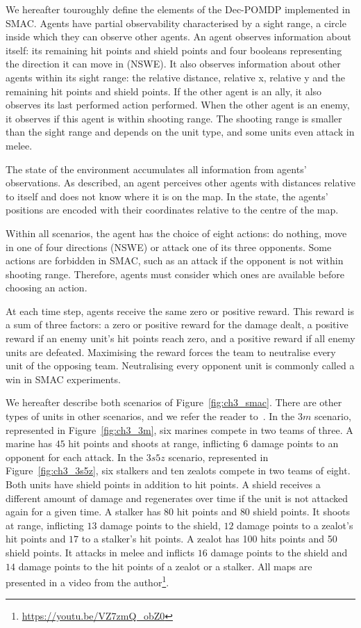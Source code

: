 We hereafter touroughly define the elements of the Dec-POMDP implemented in SMAC.
Agents have partial observability characterised by a sight range, a circle inside which they can observe other agents.
An agent observes information about itself: its remaining hit points and shield points and four booleans representing the direction it can move in (NSWE). 
It also observes information about other agents within its sight range: the relative distance, relative x, relative y and the remaining hit points and shield points. 
If the other agent is an ally, it also observes its last performed action performed.
When the other agent is an enemy, it observes if this agent is within shooting range.
The shooting range is smaller than the sight range and depends on the unit type, and some units even attack in melee.

The state of the environment accumulates all information from agents' observations.
As described, an agent perceives other agents with distances relative to itself and does not know where it is on the map.
In the state, the agents' positions are encoded with their coordinates relative to the centre of the map.

Within all scenarios, the agent has the choice of eight actions: do nothing, move in one of four directions (NSWE) or attack one of its three opponents.
Some actions are forbidden in SMAC, such as an attack if the opponent is not within shooting range.
Therefore, agents must consider which ones are available before choosing an action.

At each time step, agents receive the same zero or positive reward. 
This reward is a sum of three factors: a zero or positive reward for the damage dealt, a positive reward if an enemy unit's hit points reach zero, and a positive reward if all enemy units are defeated. 
Maximising the reward forces the team to neutralise every unit of the opposing team.
Neutralising every opponent unit is commonly called a win in SMAC experiments.

We hereafter describe both scenarios of Figure~\ref{fig:ch3_smac}.
There are other types of units in other scenarios, and we refer the reader to~\citep{samvelyan2019starcraft}.
In the $3m$ scenario, represented in Figure~\ref{fig:ch3_3m}, six marines compete in two teams of three.
A marine has $45$ hit points and shoots at range, inflicting $6$ damage points to an opponent for each attack.
In the $3s5z$ scenario, represented in Figure~\ref{fig:ch3_3s5z}, six stalkers and ten zealots compete in two teams of eight.
Both units have shield points in addition to hit points.
A shield receives a different amount of damage and regenerates over time if the unit is not attacked again for a given time.
A stalker has $80$ hit points and $80$ shield points.
It shoots at range, inflicting $13$ damage points to the shield, $12$ damage points to a zealot's hit points and $17$ to a stalker's hit points.
A zealot has 100 hits points and 50 shield points.
It attacks in melee and inflicts $16$ damage points to the shield and $14$ damage points to the hit points of a zealot or a stalker.
All maps are presented in a video from the author\footnote{\url{https://youtu.be/VZ7zmQ_obZ0}}.

